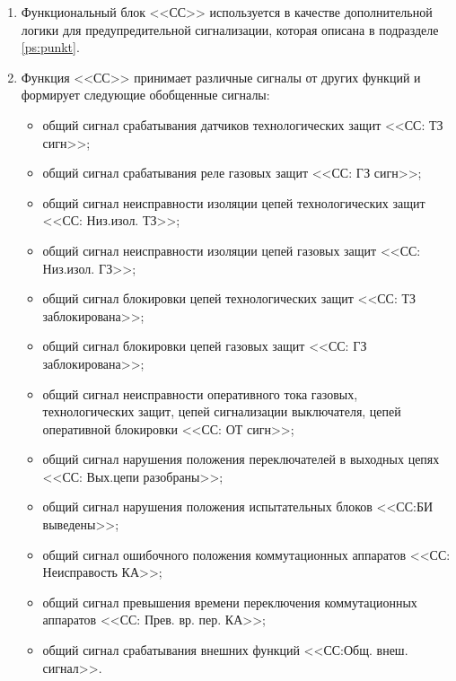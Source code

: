 \color{black}

\begin{enumerate}
\item
Функциональный блок <<СС>> используется в качестве дополнительной логики для предупредительной сигнализации, которая описана в подразделе \ref{ps:punkt}.
\item
Функция <<СС>> принимает различные сигналы от других функций и формирует следующие обобщенные сигналы:
\begin{itemize}
	\item общий сигнал срабатывания датчиков технологических защит <<СС: ТЗ сигн>>;
	\item общий сигнал срабатывания реле газовых защит <<СС: ГЗ сигн>>;
	\item общий сигнал неисправности изоляции цепей технологических защит <<СС: Низ.изол. ТЗ>>;
	\item общий сигнал неисправности изоляции цепей газовых защит <<СС: Низ.изол. ГЗ>>;		
	\item общий сигнал блокировки цепей технологических защит <<СС: ТЗ заблокирована>>;	
	\item общий сигнал блокировки цепей газовых защит <<СС: ГЗ заблокирована>>;
	\item общий сигнал неисправности оперативного тока газовых, технологических защит, цепей сигнализации выключателя, цепей оперативной блокировки <<СС: ОТ сигн>>;	
	\item общий сигнал нарушения положения переключателей в выходных цепях <<СС: Вых.цепи разобраны>>;
	\item общий сигнал нарушения положения испытательных блоков <<СС:БИ выведены>>;
	\item общий сигнал ошибочного положения коммутационных аппаратов <<СС: Неисправость КА>>;
	\item общий сигнал превышения времени переключения коммутационных аппаратов <<СС: Прев. вр. пер. КА>>;
	\item общий сигнал срабатывания внешних функций <<СС:Общ. внеш. сигнал>>.
\end{itemize}


\end{enumerate}
